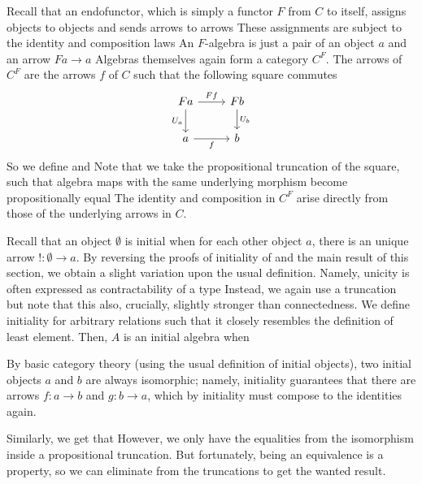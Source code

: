 Recall that an endofunctor, which is simply a functor $F$ from $C$ to itself, assigns objects to objects and sends arrows to arrows
These assignments are subject to the identity and composition laws
An $F$-algebra is just a pair of an object $a$ and an arrow $Fa \to a$
Algebras themselves again form a category $C^F$. The arrows of $C^F$ are the arrows $f$ of $C$ such that the following square commutes%
\[\begin{tikzcd}[ampersand replacement=\&]
	Fa \& Fb \\
	a \& b
	\arrow["f"', from=2-1, to=2-2]
	\arrow["{U_a}"', from=1-1, to=2-1]
	\arrow["{U_b}", from=1-2, to=2-2]
	\arrow["Ff", from=1-1, to=1-2]
\end{tikzcd}\]
So we define
and
Note that we take the propositional truncation of the square, such that algebra maps with the same underlying morphism become propositionally equal
The identity and composition in $C^F$ arise directly from those of the underlying arrows in $C$.

Recall that an object $\emptyset$ is initial when for each other object $a$, there is an unique arrow $!: \emptyset \to a$. By reversing the proofs of initiality of  and the main result of this section, we obtain a slight variation upon the usual definition. Namely, unicity is often expressed as contractability of a type
Instead, we again use a truncation
but note that this also, crucially, slightly stronger than connectedness. We define initiality for arbitrary relations
such that it closely resembles the definition of least element. Then, $A$ is an initial algebra when

By basic category theory (using the usual definition of initial objects), two initial objects $a$ and $b$ are always isomorphic;
namely, initiality guarantees that there are arrows $f : a \to b$ and $g : b \to a$, which by initiality must compose to the identities again.

Similarly, we get that
However, we only have the equalities from the isomorphism inside a propositional truncation. But fortunately, being an equivalence is a property, so we can eliminate from the truncations to get the wanted result.

